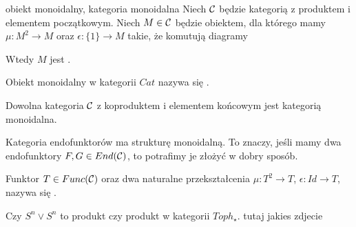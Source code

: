 \begin{definition}{obiekt monoidalny, kategoria monoidalna}{}
  Niech $\mathcal{C}$ będzie kategorią z produktem i elementem początkowym. Niech $M\in \mathcal{C}$ będzie obiektem, dla którego mamy $\mu:M^2\to M$ oraz $\epsilon: \{1\}\to M$ takie, że komutują diagramy
  \begin{center}
  \end{center}
  \begin{center}
  \end{center}
  Wtedy $M$ jest .
  
  Obiekt monoidalny w kategorii $Cat$ nazywa się .
\end{definition}

\begin{example}[m]
\item Dowolna kategoria $\mathcal{C}$ z koproduktem i elementem końcowym jest kategorią monoidalna.
\item Kategoria endofunktorów ma strukturę monoidalną. To znaczy, jeśli mamy dwa endofunktory $F, G\in End(\mathcal{C})$, to potrafimy je złożyć w dobry sposób.

  Funktor $T\in Func(\mathcal{C})$ oraz dwa naturalne przekształcenia $\mu:T^2\to T$, $\epsilon: Id\to T$, nazywa się .
\end{example}

Czy $S^n\vee S^n$ to produkt czy produkt w kategorii $Toph_\star$. tutaj jakies zdjecie






